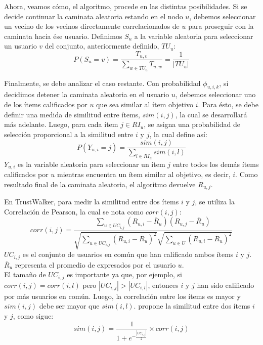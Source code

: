 			Ahora, veamos cómo, el algoritmo, procede en las distintas posibilidades. Si se decide continuar la caminata aleatoria estando en el nodo $u$, debemos seleccionar un vecino de los vecinos directamente correlacionados de $u$ para proseguir con la caminata hacia ése usuario. Definimos $S_u$ a la variable aleatoria para seleccionar un usuario $v$ del conjunto, anteriormente definido, $TU_u$:
			\begin{equation}
				P(S_u = v) = \frac{T_{u,v}}{\sum_{w \in TU_u} T_{u,w}} = \frac{1}{|TU_u|}
			\end{equation}
			
			Finalmente, se debe analizar el caso restante. Con probabilidad $\phi_{u,i,k}$, si decidimos detener la caminata aleatoria en el usuario $u$, debemos seleccionar uno de los ítems calificados por $u$ que sea similar al ítem objetivo $i$. Para ésto, se debe definir una medida de similitud entre ítems, $sim(i,j)$, la cual se desarrollará más adelante. Luego, para cada ítem $j \in RI_u$, se asigna una probabilidad de selección proporcional a la similitud entre $i$ y $j$, la cual \cite{jamali2009} define así:
			\begin{equation}
				P(Y_{u,i} = j) = \frac{sim(i,j)}{\sum_{l \in RI_u} sim(i,l)}
			\end{equation}
			$Y_{u,i}$ es la variable aleatoria para seleccionar un ítem $j$ entre todos los demás ítems calificados por $u$ mientras encuentra un ítem similar al objetivo, es decir, $i$. Como resultado final de la caminata aleatoria, el algoritmo devuelve $R_{u,j}$. \par
			
			En TrustWalker, para medir la similitud entre dos ítems $i$ y $j$, se utiliza la Correlación de Pearson, la cual se nota como $corr(i,j)$:
			\begin{equation}
				corr(i,j) = \frac{\sum_{u \in UC_{i,j}} (R_{u,i} - \overline{R}_u)(R_{u,j} - \overline{R}_u)}{\sqrt{\sum_{u \in UC_{i,j}} (R_{u,i} - \overline{R}_u)^2}\sqrt{\sum_{u \in U} (R_{u,i} - \overline{R}_u)^2}}
			\end{equation}		
			$UC_{i,j}$ es el conjunto de usuarios en común que han calificado ambos ítems $i$ y $j$. $\overline{R}_u$ representa el promedio de expresados por el usuario $u$. \\
			
			El tamaño de $UC_{i,j}$ es importante ya que, por ejemplo, si $corr(i,j) = corr(i,l)$ pero $|UC_{i,j}| > |UC_{i,l}|$, entonces $i$ y $j$ han sido calificado por más usuarios en común. Luego, la correlación entre los ítems es mayor y $sim(i,j)$ debe ser mayor que $sim(i,l)$. \cite{jamali2009} propone la similitud entre dos ítems $i$ y $j$, como sigue:
			\begin{equation}
				sim(i,j) = \frac{1}{1 + e^{-\frac{|UC_{i,j}|}{2}}} \times corr(i,j)
			\end{equation}
			
